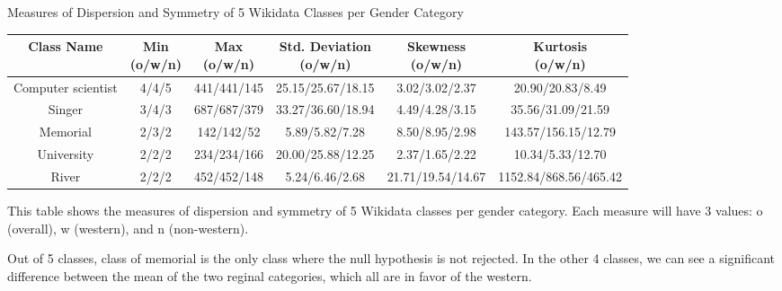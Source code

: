 \begin{center}
\scriptsize
\begin{threeparttable}
\captionsetup{font=small}
\caption{Measures of Dispersion and Symmetry of 5 Wikidata Classes per Gender Category}
\label{tab:western - dispersion and symmetry}
\begin{tabular}{c | c c c c c} 

\toprule
    Class Name & \CellWithForceBreak{Min \\ (o/w/n)} & \CellWithForceBreak{Max \\ (o/w/n)} & \CellWithForceBreak{Std. Deviation \\ (o/w/n)} & \CellWithForceBreak{Skewness \\ (o/w/n)} & \CellWithForceBreak{Kurtosis \\ (o/w/n)} \\ [0.5ex] 
\midrule
    Computer scientist & 4/4/5 & 441/441/145 & 25.15/25.67/18.15 & 3.02/3.02/2.37 & 20.90/20.83/8.49 \\
    Singer & 3/4/3 & 687/687/379 & 33.27/36.60/18.94 & 4.49/4.28/3.15 & 35.56/31.09/21.59 \\
    Memorial & 2/3/2 & 142/142/52 & 5.89/5.82/7.28 & 8.50/8.95/2.98 & 143.57/156.15/12.79 \\
    University & 2/2/2 & 234/234/166 & 20.00/25.88/12.25 & 2.37/1.65/2.22 & 10.34/5.33/12.70 \\
    River & 2/2/2 & 452/452/148 & 5.24/6.46/2.68 & 21.71/19.54/14.67 & 1152.84/868.56/465.42 \\
    [1ex]
\bottomrule
\end{tabular}
\begin{tablenotes}
    \scriptsize
    \item{This table shows the measures of dispersion and symmetry of 5 Wikidata classes per gender category. Each measure will have 3 values: o (overall), w (western), and n (non-western).}
\end{tablenotes}
\end{threeparttable}
\end{center}

Out of 5 classes, class of memorial is the only class where the null hypothesis is not rejected. In the other 4 classes, we can see a significant difference between the mean of the two reginal categories, which all are in favor of the western.


